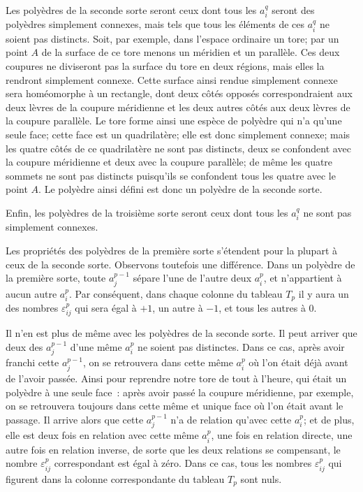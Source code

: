 \documentclass{article}
\begin{document}
Les polyèdres de la seconde sorte seront ceux dont tous les $a^{q}_{i}$ seront des polyèdres simplement connexes, mais tels que tous les éléments de ces $a^{q}_{i}$ ne soient pas distincts. Soit, par exemple, dans l'espace ordinaire un tore; par un point $A$ de la surface de ce tore menons un méridien et un parallèle. Ces deux coupures ne diviseront pas la surface du tore en deux régions, mais elles la rendront simplement connexe. Cette surface ainsi rendue simplement connexe sera homéomorphe à un rectangle, dont deux côtés opposés correspondraient aux deux lèvres de la coupure méridienne et les deux autres côtés aux deux lèvres de la coupure parallèle. Le tore forme ainsi une espèce de polyèdre qui n'a qu'une seule face; cette face est un quadrilatère; elle est donc simplement connexe; mais les quatre côtés de ce quadrilatère ne sont pas distincts, deux se confondent avec la coupure méridienne et deux avec la coupure parallèle; de même les quatre sommets ne sont pas distincts puisqu'ils se confondent tous les quatre avec le point $A$. Le polyèdre ainsi défini est donc un polyèdre de la seconde sorte.

Enfin, les polyèdres de la troisième sorte seront ceux dont tous les $a^{q}_{i}$ ne sont pas simplement connexes.

Les propriétés des polyèdres de la première sorte s'étendent pour la plupart à ceux de la seconde sorte. Observons toutefois une différence. Dans un polyèdre de la première sorte, toute $a^{p-1}_{j}$ sépare l'une de l'autre deux $a^{p}_{i}$, et n'appartient à aucun autre $a^{p}_{i}$. Par conséquent, dans chaque colonne du tableau $T_{p}$ il y aura un des nombres $\varepsilon^{p}_{ij}$ qui sera égal à $+1$, un autre à $-1$, et tous les autres à 0.

Il n'en est plus de même avec les polyèdres de la seconde sorte. Il peut arriver que deux des $a^{p-1}_{j}$ d'une même $a^{p}_{i}$ ne soient pas distinctes. Dans ce cas, après avoir franchi cette $a^{p-1}_{j}$, on se retrouvera dans cette même $a^{p}_{i}$ où l'on était déjà avant de l'avoir passée. Ainsi pour reprendre notre tore de tout à l'heure, qui était un polyèdre à une seule face~: après avoir passé la coupure méridienne, par exemple, on se retrouvera toujours dans cette même et unique face où l'on était avant le passage. Il arrive alors que cette $a^{p-1}_{j}$ n'a de relation qu'avec cette $a^{p}_{i}$; et de plus, elle est deux fois en relation avec cette même $a^{p}_{i}$, une fois en relation directe, une autre fois en relation inverse, de sorte que les deux relations se compensant, le nombre $\varepsilon^{p}_{ij}$ correspondant est égal à zéro. Dans ce cas, tous les nombres $\varepsilon^{p}_{ij}$ qui figurent dans la colonne correspondante du tableau $T_{p}$ sont nuls.
\end{document}
